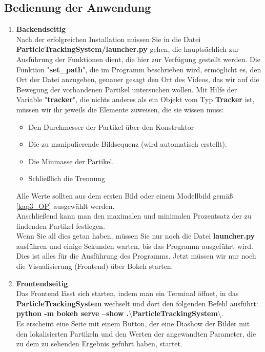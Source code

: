 \subsection{Bedienung der Anwendung}
\begin{enumerate}
	\item \textbf{Backendseitig}\\
	Nach der erfolgreichen Installation müssen Sie in die Datei \textbf{ParticleTrackingSystem/launcher.py} gehen, die hauptsächlich zur Ausführung der Funktionen dient, die hier zur Verfügung gestellt werden. Die Funktion "\textbf{set\_path}", die im Programm beschrieben wird, ermöglicht es, den Ort der Datei anzugeben, genauer gesagt den Ort des Videos, das wir auf die Bewegung der vorhandenen Partikel untersuchen wollen. 
Mit Hilfe der Variable "\textbf{tracker}", die nichts anderes als ein Objekt vom Typ \textbf{Tracker} ist, müssen wir ihr jeweils die Elemente zuweisen, die sie wissen muss:
\begin{itemize}
   \item Den Durchmesser der Partikel über den Konstruktor
   
   \item Die zu manipulierende Bildsequenz (wird automatisch erstellt).
   
   \item Die Minmasse der Partikel.
   
   \item Schließlich die Trennung
\end{itemize}

Alle Werte sollten aus dem ersten Bild oder einem Modellbild gemäß \ref{kap3_OP} ausgewählt werden.\\
Anschließend kann man den maximalen und minimalen Prozentsatz der zu findenden Partikel festlegen.\\
Wenn Sie all dies getan haben, müssen Sie nur noch die Datei \textbf{launcher.py} ausführen und einige Sekunden warten, bis das Programm ausgeführt wird. Dies ist alles für die Ausführung des Programms. Jetzt müssen wir nur noch die Visualisierung (Frontend) über Bokeh starten.
	\item \textbf{Frontendseitig}\\
	Das Frontend lässt sich starten, indem man ein Terminal öffnet, in das \textbf{ParticleTrackingSystem} wechselt und dort den folgenden Befehl ausführt:\\ \textbf{python -m bokeh serve --show .$\setminus$ParticleTrackingSystem$\setminus$}. \\ Es erscheint eine Seite mit einem Button, der eine Diashow der Bilder mit den lokalisierten Partikeln und den Werten der angewandten Parameter, die zu dem zu sehenden Ergebnis geführt haben, startet.
	

\end{enumerate}
